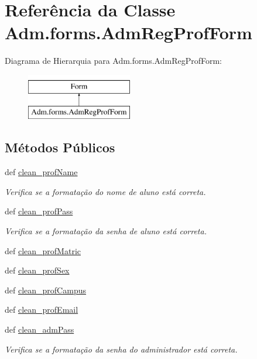 \hypertarget{classAdm_1_1forms_1_1AdmRegProfForm}{\section{Referência da Classe Adm.\-forms.\-Adm\-Reg\-Prof\-Form}
\label{classAdm_1_1forms_1_1AdmRegProfForm}
}
Diagrama de Hierarquia para Adm.\-forms.\-Adm\-Reg\-Prof\-Form\-:\begin{figure}[H]
\begin{center}
\leavevmode
\includegraphics[height=2.000000cm]{d3/d88/classAdm_1_1forms_1_1AdmRegProfForm}
\end{center}
\end{figure}
\subsection*{Métodos Públicos}
\begin{DoxyCompactItemize}
\item 
def \hyperlink{classAdm_1_1forms_1_1AdmRegProfForm_a26bfe5f304a419a438bbfd35b6d9f891}{clean\-\_\-prof\-Name}
\begin{DoxyCompactList}\small\item\em Verifica se a formatação do nome de aluno está correta. \end{DoxyCompactList}\item 
def \hyperlink{classAdm_1_1forms_1_1AdmRegProfForm_a76ad8b959e07cd987f0a3f491bc58fcf}{clean\-\_\-prof\-Pass}
\begin{DoxyCompactList}\small\item\em Verifica se a formatação da senha de aluno está correta. \end{DoxyCompactList}\item 
def \hyperlink{classAdm_1_1forms_1_1AdmRegProfForm_ac304be31b6186493cef0b108886a060c}{clean\-\_\-prof\-Matric}
\item 
def \hyperlink{classAdm_1_1forms_1_1AdmRegProfForm_a1586abd52a95f448af23eee2f469cbef}{clean\-\_\-prof\-Sex}
\item 
def \hyperlink{classAdm_1_1forms_1_1AdmRegProfForm_aabf2b7b7b871421e93324228b870ec8a}{clean\-\_\-prof\-Campus}
\item 
def \hyperlink{classAdm_1_1forms_1_1AdmRegProfForm_aa74cf0e5d495b7d7a39d91100bd29278}{clean\-\_\-prof\-Email}
\item 
def \hyperlink{classAdm_1_1forms_1_1AdmRegProfForm_a1d6ca5be033cd0e18f23124370b4dc3a}{clean\-\_\-adm\-Pass}
\begin{DoxyCompactList}\small\item\em Verifica se a formatação da senha do administrador está correta. \end{DoxyCompactList}\end{DoxyCompactItemize}
